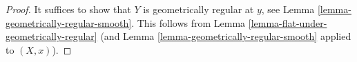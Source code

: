 \documentclass[10pt,a4paper]{amsart}
\theoremstyle{plain}
\theoremstyle{definition}
\theoremstyle{remark}
\numberwithin{equation}{subsection}
\begin{document}
\begin{proof}
It suffices to show that $Y$ is geometrically regular at $y$, see
Lemma \ref{lemma-geometrically-regular-smooth}.
This follows from
Lemma \ref{lemma-flat-under-geometrically-regular}
(and
Lemma \ref{lemma-geometrically-regular-smooth}
applied to $(X, x)$).
\end{proof}
\end{document}
